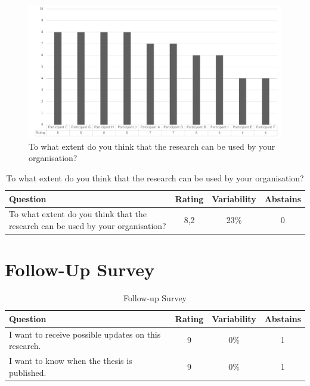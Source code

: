 \begin{figure}[H]
	\centering
	\includegraphics[width=0.9\linewidth]{images/validationresult_researchrelevanceorganisation}
	\caption[To what extent do you think that the research can be used by your organisation?]{To what extent do you think that the research can be used by your organisation?}
	\label{fig:validationrelevantorganisation}
\end{figure}
\begin{table}[H]
	\centering
	\begin{tabular}{p{}ccc}
		\toprule
		\textbf{Question} & \textbf{Rating} & \textbf{Variability} & \textbf{Abstains} \\
		\midrule
		To what extent do you think that the research can be used by your organisation? & 8,2 & 23\% & 0 \\%
		\bottomrule
	\end{tabular}%
	\caption[To what extent do you think that the research can be used by your organisation?]{To what extent do you think that the research can be used by your organisation?}
	\label{tab:validationrelevantorganisation}%
\end{table}%





\section{Follow-Up Survey}
\begin{table}[!h]
	\centering
	\begin{tabular}{p{}ccc}
		\toprule
		\textbf{Question} & \textbf{Rating} & \textbf{Variability} & \textbf{Abstains} \\
		\midrule
		I want to receive possible updates on this research. & 9 & 0\% & 1 \\%
		I want to know when the thesis is published. & 9 & 0\% & 1 \\%
		\bottomrule
	\end{tabular}%
	\caption{Follow-up Survey}
	\label{tab:appfollowupsurvey}%
\end{table}%